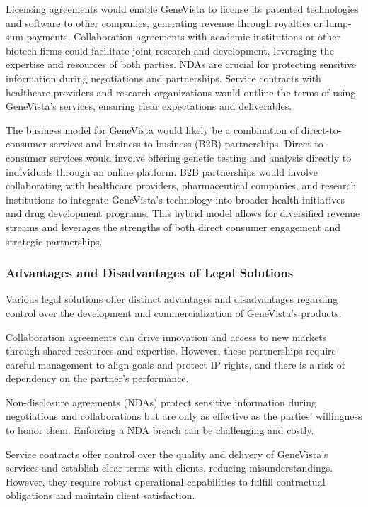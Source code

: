 \documentclass[a4paper]{article}
\begin{document}
Licensing agreements would enable GeneVista to license its patented technologies and software to other companies, generating revenue through royalties or lump-sum payments. Collaboration agreements with academic institutions or other biotech firms could facilitate joint research and development, leveraging the expertise and resources of both parties. NDAs are crucial for protecting sensitive information during negotiations and partnerships. Service contracts with healthcare providers and research organizations would outline the terms of using GeneVista's services, ensuring clear expectations and deliverables.

The business model for GeneVista would likely be a combination of direct-to-consumer services and business-to-business (B2B) partnerships. Direct-to-consumer services would involve offering genetic testing and analysis directly to individuals through an online platform. B2B partnerships would involve collaborating with healthcare providers, pharmaceutical companies, and research institutions to integrate GeneVista's technology into broader health initiatives and drug development programs. This hybrid model allows for diversified revenue streams and leverages the strengths of both direct consumer engagement and strategic partnerships.

\subsubsection{Advantages and Disadvantages of Legal Solutions}

Various legal solutions offer distinct advantages and disadvantages regarding control over the development and commercialization of GeneVista's products.

Collaboration agreements can drive innovation and access to new markets through shared resources and expertise. However, these partnerships require careful management to align goals and protect IP rights, and there is a risk of dependency on the partner’s performance.

Non-disclosure agreements (NDAs) protect sensitive information during negotiations and collaborations but are only as effective as the parties' willingness to honor them. Enforcing a NDA breach can be challenging and costly.

Service contracts offer control over the quality and delivery of GeneVista’s services and establish clear terms with clients, reducing misunderstandings. However, they require robust operational capabilities to fulfill contractual obligations and maintain client satisfaction.
\end{document}
